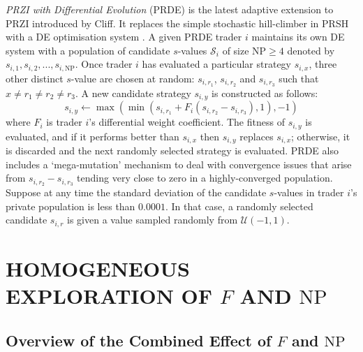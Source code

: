 \documentclass[a4paper,twoside]{article}
\begin{document}
\textit{PRZI with Differential Evolution} (PRDE) \cite{PRDE} is the latest adaptive extension to PRZI introduced by Cliff.
It replaces the simple stochastic hill-climber in PRSH with a DE optimisation system \cite{StornPrice}.
A given PRDE trader $i$ maintains its own DE system with a population of candidate $s$-values $\mathcal{S}_i$ of size $\mathrm{NP}\ge4$ denoted by $s_{i,1},s_{i,2},...,s_{i,\mathrm{NP}}$.
Once trader $i$ has evaluated a particular strategy $s_{i,x}$, three other distinct $s$-value are chosen at random: $s_{i,r_1}$, $s_{i,r_2}$ and $s_{i,r_3}$ such that $x\ne r_1\ne r_2\ne r_3$.
A new candidate strategy $s_{i,y}$ is constructed as follows:
\[
s_{i,y}\leftarrow\max(\min(s_{i,r_1}+F_i(s_{i,r_2}-s_{i,r_3}),1), -1)
\]
where $F_i$ is trader $i$'s differential weight coefficient.
The fitness of $s_{i,y}$ is evaluated, and if it performs better than $s_{i,x}$ then $s_{i,y}$ replaces $s_{i,x}$; otherwise, it is discarded and the next randomly selected strategy is evaluated.
PRDE also includes a `mega-mutation' mechanism to deal with convergence issues that arise from $s_{i,r_2}-s_{i,r_3}$ tending very close to zero in a highly-converged population.
Suppose at any time the standard deviation of the candidate $s$-values in trader $i$'s private population is less than $0.0001$.
In that case, a randomly selected candidate $s_{i,r}$ is given a value sampled randomly from $\mathcal{U}(-1,1)$.

\section{\uppercase{Homogeneous Exploration of $F$ and $\mathrm{NP}$}}

\subsection{Overview of the Combined Effect of $F$ and $\mathrm{NP}$}
\end{document}
